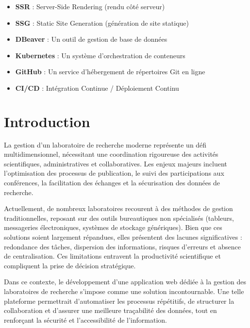 \documentclass[12pt]{rapportPfe}
\begin{document}
\begin{itemize}
	  \item \textbf{SSR} : Server-Side Rendering (rendu côté serveur)
	  \item \textbf{SSG} : Static Site Generation (génération de site statique)
	  \item \textbf{DBeaver} : Un outil de gestion de base de données
	  \item \textbf{Kubernetes} : Un système d'orchestration de conteneurs
	  \item \textbf{GitHub} : Un service d'hébergement de répertoires Git en ligne
	  \item \textbf{CI/CD} : Intégration Continue / Déploiement Continu
	\end{itemize}

\newpage
\chapter*{Introduction}

La gestion d’un laboratoire de recherche moderne représente un défi multidimensionnel, nécessitant une coordination rigoureuse des activités scientifiques, administratives et collaboratives. Les enjeux majeurs incluent l’optimisation des processus de publication, le suivi des participations aux conférences, la facilitation des échanges et la sécurisation des données de recherche.

Actuellement, de nombreux laboratoires recourent à des méthodes de gestion traditionnelles, reposant sur des outils bureautiques non spécialisés (tableurs, messageries électroniques, systèmes de stockage génériques). Bien que ces solutions soient largement répandues, elles présentent des lacunes significatives : redondance des tâches, dispersion des informations, risques d’erreurs et absence de centralisation. Ces limitations entravent la productivité scientifique et compliquent la prise de décision stratégique.

Dans ce contexte, le développement d’une application web dédiée à la gestion des laboratoires de recherche s’impose comme une solution incontournable. Une telle plateforme permettrait d’automatiser les processus répétitifs, de structurer la collaboration et d’assurer une meilleure traçabilité des données, tout en renforçant la sécurité et l’accessibilité de l’information.

\newpage
\tabledematieres

\newpage
\listoffigures

\newpage
\listoftables
\end{document}
